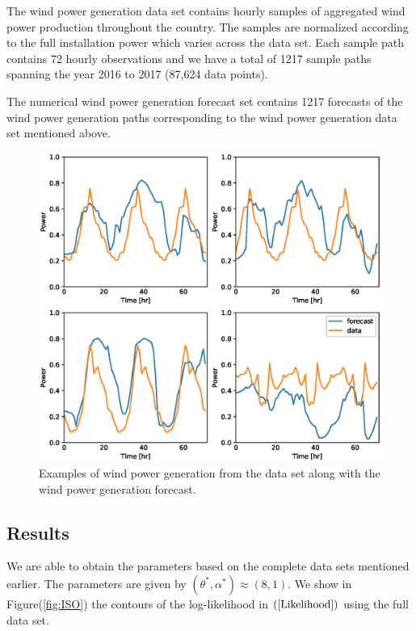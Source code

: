\documentclass[10pt,twocolumn,letterpaper]{article}
\begin{document}
The wind power generation data set contains hourly samples of aggregated wind power production throughout the country. The samples are normalized according to the full installation power which varies across the data set. Each sample path contains 72 hourly observations and we have a total of 1217 sample paths spanning the year 2016 to 2017 (87,624 data points).

The numerical wind power generation forecast set contains  1217 forecasts of the wind power generation paths corresponding to the wind power generation data set mentioned above.


\begin{figure}[t]
\begin{center}
   \includegraphics[width=0.8\linewidth]{forecast_data.eps}
\end{center}
   \caption{Examples of wind power generation from the data set along with the wind power generation forecast.}
\label{fig:long}
\label{fig:onecol}
\end{figure}





\subsection{Results}
 We are able to obtain the parameters based on the complete data sets mentioned earlier. The parameters are given by $(\theta^*, \alpha^*)\approx (8,1)$. We show in Figure(\ref{fig:ISO}) the contours of the log-likelihood in $(\ref{Likelihood})$ using the full data set.
 
\end{document}
